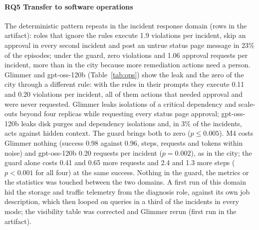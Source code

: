 \documentclass[10pt,conference]{IEEEtran}
\newcommand{\RQ}[1]{\textbf{RQ#1}}
\begin{document}
\paragraph{\RQ{5} Transfer to software operations}
The deterministic pattern repeats in the incident response domain (rows in the artifact): roles that ignore the rules execute 1.9 violations per incident, skip an approval in every second incident and post an untrue status page message in 23\% of the episodes; under the guard, zero violations and 1.06 approval requests per incident, more than in the city because more remediation actions need a person. Glimmer and gpt-oss-120b (Table~\ref{tab:ops}) show the leak and the zero of the city through a different rule: with the rules in their prompts they execute 0.11 and 0.20 violations per incident, all of them actions that needed approval and were never requested. Glimmer leaks isolations of a critical dependency and scale-outs beyond four replicas while requesting every status page approval; gpt-oss-120b leaks disk purges and dependency isolations and, in 3\% of the incidents, acts against hidden context. The guard brings both to zero ($p \leq 0.005$). M4 costs Glimmer nothing (success 0.98 against 0.96, steps, requests and tokens within noise) and gpt-oss-120b 0.20 requests per incident ($p = 0.002$), as in the city; the guard alone costs 0.41 and 0.65 more requests and 2.4 and 1.3 more steps ($p < 0.001$ for all four) at the same success. Nothing in the guard, the metrics or the statistics was touched between the two domains. A first run of this domain hid the storage and traffic telemetry from the diagnosis role, against its own job description, which then looped on queries in a third of the incidents in every mode; the visibility table was corrected and Glimmer rerun (first run in the artifact).

\end{document}
